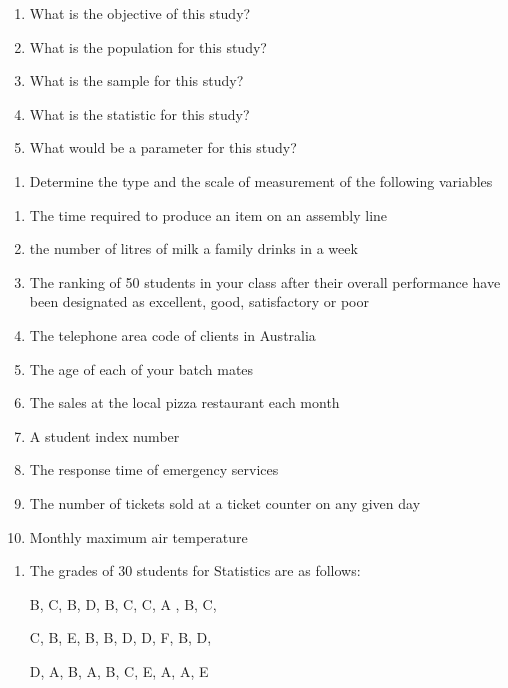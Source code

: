 \documentclass[]{book}
\providecommand{\tightlist}{%
  \setlength{\itemsep}{0pt}\setlength{\parskip}{0pt}}
\begin{document}
\begin{enumerate}
\def\labelenumi{\alph{enumi}.}
\tightlist
\item
  What is the objective of this study?
\item
  What is the population for this study?
\item
  What is the sample for this study?
\item
  What is the statistic for this study?
\item
  What would be a parameter for this study?
\end{enumerate}

\begin{enumerate}
\def\labelenumi{\arabic{enumi}.}
\setcounter{enumi}{1}
\tightlist
\item
  Determine the type and the scale of measurement of the following variables
\end{enumerate}

\begin{enumerate}
\def\labelenumi{\alph{enumi}.}
\tightlist
\item
  The time required to produce an item on an assembly line
\item
  the number of litres of milk a family drinks in a week
\item
  The ranking of 50 students in your class after their overall performance have been designated as excellent, good, satisfactory or poor
\item
  The telephone area code of clients in Australia
\item
  The age of each of your batch mates
\item
  The sales at the local pizza restaurant each month
\item
  A student index number
\item
  The response time of emergency services
\item
  The number of tickets sold at a ticket counter on any given day
\item
  Monthly maximum air temperature
\end{enumerate}

\begin{enumerate}
\def\labelenumi{\arabic{enumi}.}
\setcounter{enumi}{2}
\item
  The grades of 30 students for Statistics are as follows:

  B, C, B, D, B, C, C, A , B, C,

  C, B, E, B, B, D, D, F, B, D,

  D, A, B, A, B, C, E, A, A, E
\end{enumerate}
\end{document}
